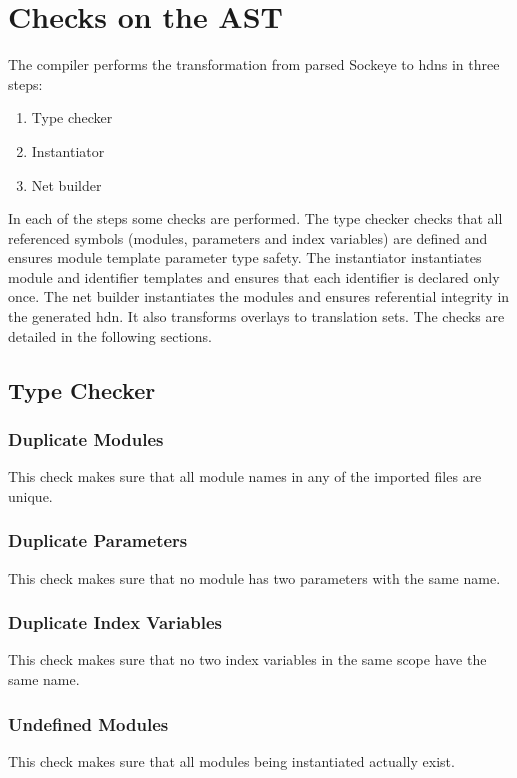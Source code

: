 \documentclass[a4paper,11pt,twoside]{report}
\begin{document}
{{{\chapter{Checks on the AST}
\label{chap:checks}
The compiler performs the transformation from parsed Sockeye to \gls{hdn}s in three steps:
\begin{enumerate}
    \item Type checker
    \item Instantiator
    \item Net builder
\end{enumerate}
In each of the steps some checks are performed.
The type checker checks that all referenced symbols (modules, parameters and index variables) are defined and ensures module template parameter type safety.
The instantiator instantiates module and identifier templates and ensures that each identifier is declared only once.
The net builder instantiates the modules and ensures referential integrity in the generated \gls{hdn}. It also transforms overlays to translation sets.
The checks are detailed in the following sections.

\section{Type Checker}
\subsection{Duplicate Modules}
This check makes sure that all module names in any of the imported files are unique.

\subsection{Duplicate Parameters}
This check makes sure that no module has two parameters with the same name.

\subsection{Duplicate Index Variables}
This check makes sure that no two index variables in the same scope have the same name.

\subsection{Undefined Modules}
This check makes sure that all modules being instantiated actually exist.

}}}
\end{document}
